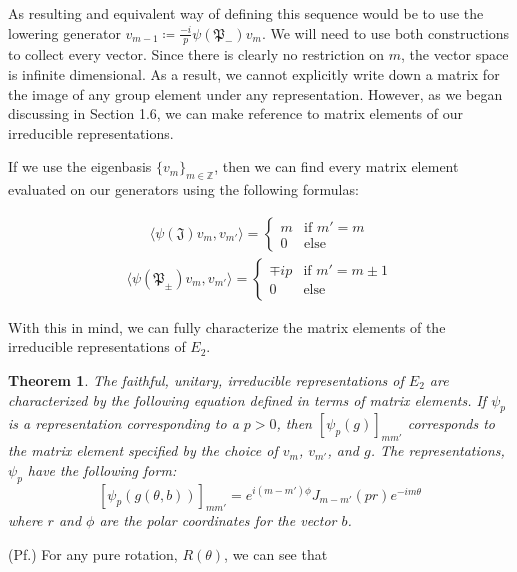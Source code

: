 \documentclass[10pt]{ucthesis}
\newcommand{\Z}{\mathbb{Z}}
\newtheorem{theorem}[definition]{Theorem}
\begin{document}
As resulting and equivalent way of defining this sequence would be to use the lowering generator $v_{m-1} \coloneq \frac{-i}{p}\psi(\mathfrak{P}_-)v_m$. We will need to use both constructions to collect every vector. Since there is clearly no restriction on $m$, the vector space is infinite dimensional. As a result, we cannot explicitly write down a matrix for the image of any group element under any representation. However, as we began discussing in Section 1.6, we can make reference to matrix elements of our irreducible representations. 

If we use the eigenbasis $\{v_m\}_{m\in\Z}$, then we can find every matrix element evaluated on our generators using the following formulas:

\begin{equation}
\begin{aligned}
	 \langle \psi(\mathfrak{J})v_m , v_{m'} \rangle = \begin{cases}
																m & \text{if }m' = m\\
																0 & \text{else}
															\end{cases}
\end{aligned}
\end{equation}
\begin{equation}
\begin{aligned}
	 \langle \psi(\mathfrak{P}_\pm)v_m , v_{m'} \rangle = \begin{cases}
																\mp ip & \text{if }m' = m \pm 1\\
																0 & \text{else}	
															\end{cases}
\end{aligned}
\end{equation}

With this in mind, we can fully characterize the matrix elements of the irreducible representations of $E_2$.

\begin{theorem}\cite{Tung}
	The faithful, unitary, irreducible representations of $E_2$ are characterized by the following equation defined in terms of matrix elements. If $\psi_p$ is a representation corresponding to a $p>0$, then $[\psi_p(g)]_{mm'}$ corresponds to the matrix element specified by the choice of $v_m$, $v_{m'}$, and $g$. The representations, $\psi_p$ have the following form:
$$[\psi_p(g(\theta,b))]_{mm'} = e^{i(m-m')\phi}J_{m-m'}(pr)e^{-im\theta}$$
where $r$ and $\phi$ are the polar coordinates for the vector $b$.
\end{theorem}
\noindent(Pf.) For any pure rotation, $R(\theta)$, we can see that
\end{document}
